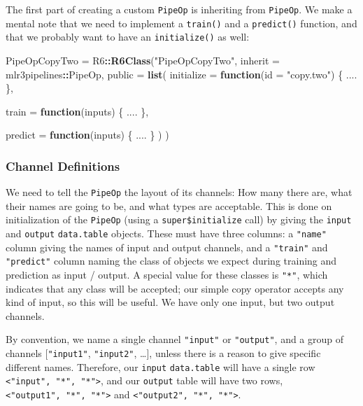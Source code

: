\documentclass[]{scrbook}
\newenvironment{Shaded}{\begin{snugshade}}{\end{snugshade}}
\newcommand{\ControlFlowTok}[1]{\textcolor[rgb]{0.13,0.29,0.53}{\textbf{#1}}}
\newcommand{\DataTypeTok}[1]{\textcolor[rgb]{0.13,0.29,0.53}{#1}}
\newcommand{\KeywordTok}[1]{\textcolor[rgb]{0.13,0.29,0.53}{\textbf{#1}}}
\newcommand{\NormalTok}[1]{#1}
\newcommand{\OperatorTok}[1]{\textcolor[rgb]{0.81,0.36,0.00}{\textbf{#1}}}
\newcommand{\StringTok}[1]{\textcolor[rgb]{0.31,0.60,0.02}{#1}}
\renewenvironment{Shaded} {\begin{snugshade}\small} {\end{snugshade}}
\begin{document}
The first part of creating a custom \texttt{PipeOp} is inheriting from \texttt{PipeOp}.
We make a mental note that we need to implement a \texttt{train()} and a \texttt{predict()} function, and that we probably want to have an \texttt{initialize()} as well:

\begin{Shaded}
\begin{Highlighting}[]
\NormalTok{PipeOpCopyTwo =}\StringTok{ }\NormalTok{R6}\OperatorTok{::}\KeywordTok{R6Class}\NormalTok{(}\StringTok{"PipeOpCopyTwo"}\NormalTok{,}
  \DataTypeTok{inherit =}\NormalTok{ mlr3pipelines}\OperatorTok{::}\NormalTok{PipeOp,}
  \DataTypeTok{public =} \KeywordTok{list}\NormalTok{(}
    \DataTypeTok{initialize =} \ControlFlowTok{function}\NormalTok{(}\DataTypeTok{id =} \StringTok{"copy.two"}\NormalTok{) \{}
\NormalTok{      ....}
\NormalTok{    \},}

    \DataTypeTok{train =} \ControlFlowTok{function}\NormalTok{(inputs) \{}
\NormalTok{      ....}
\NormalTok{    \},}

    \DataTypeTok{predict =} \ControlFlowTok{function}\NormalTok{(inputs) \{}
\NormalTok{      ....}
\NormalTok{    \}}
\NormalTok{  )}
\NormalTok{)}
\end{Highlighting}
\end{Shaded}

\hypertarget{channel-definitions}{%
\subsubsection{Channel Definitions}\label{channel-definitions}}

We need to tell the \texttt{PipeOp} the layout of its channels: How many there are, what their names are going to be, and what types are acceptable.
This is done on initialization of the \texttt{PipeOp} (using a \texttt{super\$initialize} call) by giving the \texttt{input} and \texttt{output} \texttt{data.table} objects.
These must have three columns: a \texttt{"name"} column giving the names of input and output channels, and a \texttt{"train"} and \texttt{"predict"} column naming the class of objects we expect during training and prediction as input / output.
A special value for these classes is \texttt{"*"}, which indicates that any class will be accepted; our simple copy operator accepts any kind of input, so this will be useful. We have only one input, but two output channels.

By convention, we name a single channel \texttt{"input"} or \texttt{"output"}, and a group of channels {[}\texttt{"input1"}, \texttt{"input2"}, \ldots{}{]}, unless there is a reason to give specific different names. Therefore, our \texttt{input} \texttt{data.table} will have a single row \texttt{\textless{}"input",\ "*",\ "*"\textgreater{}}, and our \texttt{output} table will have two rows, \texttt{\textless{}"output1",\ "*",\ "*"\textgreater{}} and \texttt{\textless{}"output2",\ "*",\ "*"\textgreater{}}.
\end{document}
